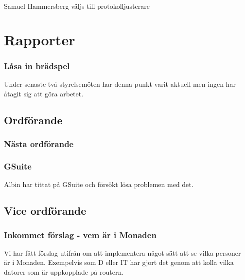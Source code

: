 \documentclass[protokoll]{dvd}
\begin{document}
\begin{attsatser}
\item Samuel Hammersberg väljs till protokolljusterare
\end{attsatser}



\section{Rapporter}

\subsubsection{Låsa in brädspel}

Under senaste två styrelsemöten har denna punkt varit aktuell men ingen har åtagit sig att göra arbetet. 




\newpage

\subsection{Ordförande}


\subsubsection{Nästa ordförande}


\subsubsection{GSuite}

Albin har tittat på GSuite och försökt lösa problemen med det.



\newpage

\subsection{Vice ordförande}


\subsubsection{Inkommet förslag - vem är i Monaden}

Vi har fått förslag utifrån om att implementera något sätt att se vilka personer är i Monaden. Exempelvis som D eller IT har gjort det genom att kolla vilka datorer som är uppkopplade på routern.
\end{document}
